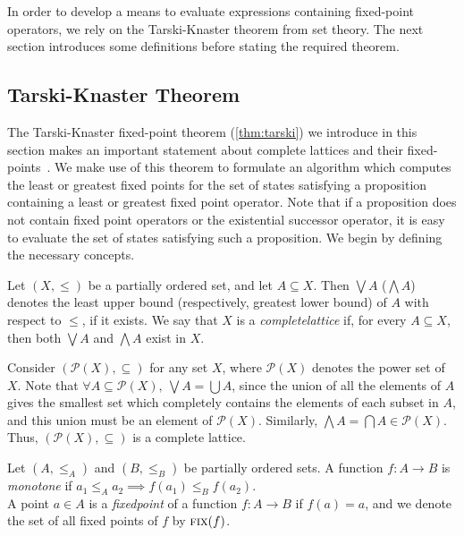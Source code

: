 In order to develop a means to evaluate expressions containing fixed-point operators, we rely on the Tarski-Knaster theorem from set theory. The next section introduces some definitions before stating the required theorem.





\subsection{Tarski-Knaster Theorem}

The Tarski-Knaster fixed-point theorem (\autoref{thm:tarski}) we introduce in this section makes an important statement about complete lattices and their fixed-points~\cite{Tarski1955}. We make use of this theorem to formulate an algorithm which computes the least or greatest fixed points for the set of states satisfying a \mucalc{} proposition containing a least or greatest fixed point operator. Note that if a proposition does not contain fixed point operators or the existential successor operator, it is easy to evaluate the set of states satisfying such a proposition. We begin by defining the necessary concepts.

\begin{defn}
    Let $(X, \leq)$ be a partially ordered set, and let $A \subseteq X$. Then $\bigvee A$ ($\bigwedge A$) denotes the least upper bound (respectively, greatest lower bound) of $A$ with respect to $\leq$, if it exists. We say that $X$ is a {\em complete\/lattice} if, for every $A \subseteq X$, then both $\bigvee A$ and $\bigwedge A$ exist in $X$.
\end{defn}

\begin{exmp}\label{ex_complat}
Consider $(\mathcal{P}(X), \subseteq)$ for any set $X$, where $\mathcal{P}(X)$ denotes the power set of $X$. Note that $\forall A \subseteq \mathcal{P}(X), \ \bigvee A = \bigcup A$, since the union of all the elements of $A$ gives the smallest set which completely contains the elements of each subset in $A$, and this union must be an element of $\mathcal{P}(X)$. Similarly, $\bigwedge A = \bigcap A \in \mathcal{P}(X)$. Thus, $(\mathcal{P}(X), \subseteq)$ is a complete lattice.
\end{exmp}

\begin{defn}
Let $(A, \leq_A)$ and $(B, \leq_B)$ be partially ordered sets. A function $f : A \to B$ is {\em monotone\/} if $a_1 \leq_A a_2 \implies f(a_1) \leq_B f(a_2)$.\\
A point $a \in A$ is a {\em fixed\/point} of a function $f: A \to B$ if $f(a) = a$, and we denote the set of all fixed points of $f$ by $\textsc{fix}(f)$.
\end{defn}

